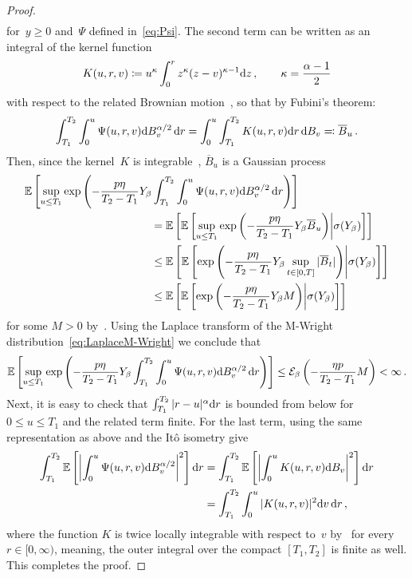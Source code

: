 \begin{proof}
\begin{align*}
\end{align*}
for~$y\geq 0$ and~$\Psi$ defined in~\eqref{eq:Psi}. The second term can be written as an integral of the kernel function
$$
K(u,r,v)\coloneqq u^\kappa \int_0^r z^\kappa (z - v)^{\kappa - 1}\mathrm{d} z\,, \qquad \kappa = \frac{\alpha - 1}{2}
$$
with respect to the related Brownian motion~\cite[Equation~7.2]{Pipiras2001AreComplete}, so that by Fubini's theorem:
\begin{equation}\label{eq:integralfBmFubini}
\int_{T_1}^{T_2} \int_0^u \Psi(u,r,v)\mathrm{d} B_v^{\alpha/2}\, \mathrm{d} r = \int_0^u \int_{T_1}^{T_2} K(u,r,v) \mathrm{d} r\, \mathrm{d} B_v \eqqcolon \overline{B}_u\,.
\end{equation}
Then, since the kernel~$K$ is integrable~\cite[Theorem~4.2]{Pipiras2001AreComplete}, $\overline{B}_u$ is a Gaussian process
\begin{align*}
&\EE\left[\sup _{u \leq T_1} \exp \left(-\frac{p\eta}{T_2-T_1} Y_\beta \int_{T_1}^{T_2} \int_0^u \Psi(u,r,v)\D B_v^{\alpha/2}\, \D r\right)\right] \\
& \hspace{4cm} = \EE\left[ \EE\left[\sup _{u \leq T_1} \exp \left(-\frac{p\eta}{T_2-T_1} Y_\beta \overline B_u\right)\middle\vert \sigma(Y_\beta)\right] \right] \\
& \hspace{4cm} \leq \EE\left[ \EE\left[ \exp \left(-\frac{p\eta}{T_2-T_1} Y_\beta \sup_{t\in[0,T]}|\overline B_t|\right)\middle\vert \sigma(Y_\beta)\right] \right] \\
& \hspace{4cm} \leq \EE\left[ \EE\left[ \exp \left(-\frac{p\eta}{T_2-T_1} Y_\beta M\right)\middle\vert \sigma(Y_\beta)\right] \right]
\end{align*}
for some $M>0$ by~\cite[Lemma~6.14]{Jacquier2021RoughOptions}. Using the Laplace transform of the M-Wright distribution~\eqref{eq:LaplaceM-Wright} we conclude that
\[
\mathbb{E}\left[\sup _{u \leq T_1} \exp \left(-\frac{p\eta}{T_2-T_1} Y_\beta \int_{T_1}^{T_2} \int_0^u \Psi(u,r,v)\mathrm{d} B_v^{\alpha/2}\, \mathrm{d} r\right)\right] \leq \mathcal{E}_\beta\left(- \frac{\eta p}{T_2-T_1} M\right) < \infty\,.
\]
Next, it is easy to check that $\int_{T_1}^{T_2}|r-u|^\alpha \mathrm{d} r$ is bounded from below for $0\leq u \leq T_1$ and the related term finite. For the last term, using the same representation as above and the It\^o isometry give
\begin{align*}
    \int_{T_1}^{T_2}\mathbb{E}\left[\left|\int_0^u \Psi(u,r,v)\mathrm{d} B_v^{\alpha/2}\right|^2\right] \mathrm{d} r 
    &= \int_{T_1}^{T_2} \mathbb{E}\left[\left|\int_0^u K(u,r,v) \mathrm{d} B_v\right|^2\right] \mathrm{d} r \\
    &= \int_{T_1}^{T_2} \int_{0}^{u}|K(u,r,v)|^2\mathrm{d} v\, \mathrm{d} r\,,
\end{align*}
where the function $K$ is twice locally integrable with respect to~$v$ by~\cite[Theorem~4.2]{Pipiras2001AreComplete} for every $r\in[0,\infty)$, meaning, the outer integral over the compact $[T_1, T_2]$ is finite as well. This completes the proof.
\end{proof}

